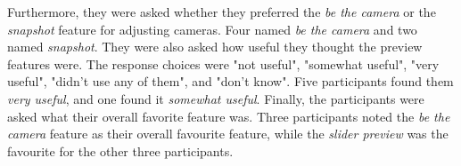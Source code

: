 Furthermore, they were asked whether they preferred the \textit{be the camera} or the \textit{snapshot} feature for adjusting cameras. Four named\textit{ be the camera} and two named \textit{snapshot}. 
They were also asked how useful they thought the preview features were. The response choices were "not useful", "somewhat useful", "very useful", "didn't use any of them", and "don't know". Five participants found them \textit{very useful}, and one found it \textit{somewhat useful}.
Finally, the participants were asked what their overall favorite feature was. Three participants noted the \textit{be the camera} feature as their overall favourite feature, while the \textit{slider preview} was the favourite for the other three participants. 




